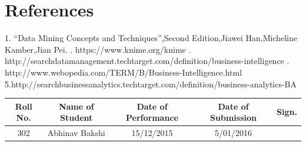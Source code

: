 \documentclass[a4paper,12pt]{article}
\begin{document}
\begin{center}
	\begin{figure}[!htbp]
		\centering
		\label{fig:usecase}
	\end{figure}
\end{center}  


\section{References} 
	1.	“Data Mining Concepts and Techniques”,Second Edition,Jiawei Han,Micheline Kamber,Jian Pei.
.	https://www.knime.org/knime
.	http://searchdatamanagement.techtarget.com/definition/business-intelligence
.	http://www.webopedia.com/TERM/B/Business-Intelligence.html
\newline
	5.http://searchbusinessanalytics.techtarget.com/definition/business-analytics-BA

\begin{center}
	\newpage	
	\begin{tabular}
		{|c|c|c|c|c|}\hline
		{\bf Roll No.}		&{\bf Name of Student}	&{\bf Date of Performance}  				&{\bf Date of Submission}	&{\bf Sign.}  \\    \hline
		302	& Abhinav Bakshi & 15/12/2015	& 	5/01/2016	&  \\ \hline
	\end{tabular}\\ 
\end{center}
	
\end{document}
